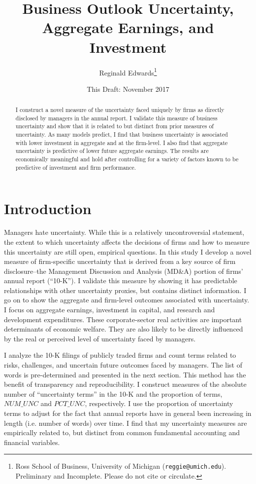 \documentclass[12pt, letterpaper]{article}
\begin{document}
 

\title{Business Outlook Uncertainty, Aggregate Earnings, and Investment}
\author{Reginald Edwards\footnote{Ross School of Business, University of Michigan
(\texttt{reggie@umich.edu}). Preliminary and Incomplete. Please do not cite or circulate.}} 
\date{This Draft: November 2017}

\maketitle 
\begin{abstract} 
I construct a novel measure of the uncertainty faced uniquely by firms as directly disclosed by managers in the annual report. I validate this measure of business uncertainty and show that it is related to but distinct from prior measures of uncertainty. As many models predict, I find that business uncertainty is associated with lower investment in aggregate and at the firm-level. I also find that aggregate uncertainty is predictive of lower future aggregate earnings. The results are economically meaningful and hold after controlling for a variety of factors known to be predictive of investment and firm performance.
\end{abstract}

\newpage 

\section{Introduction}\label{introduction} 
Managers hate uncertainty. While this is a relatively uncontroversial statement, the extent to which uncertainty affects the decisions of firms and how to measure this uncertainty are still open, empirical questions. In this study I develop a novel measure of firm-specific uncertainty that is derived from a key source of firm disclosure--the Management Discussion and Analysis (MD\&A) portion of firms' annual report (``10-K''). I validate this measure by showing it has predictable relationships with other uncertainty proxies, but contains distinct information. I go on to show the aggregate and firm-level outcomes associated with uncertainty. I focus on aggregate earnings, investment in capital, and research and development expenditures. These corporate-sector real activities are important determinants of economic welfare. They are also likely to be directly influenced by the real or perceived level of uncertainty faced by managers.

I analyze the 10-K filings of publicly traded firms and count terms related to risks, challenges, and uncertain future outcomes faced by managers. The list of words is pre-determined and presented in the next section. This method has the benefit of transparency and reproducibility. I construct measures of the absolute number of ``uncertainty terms'' in the 10-K and the proportion of terms, $NUM\_UNC$ and $PCT\_UNC$, respectively. I use the proportion of uncertainty terms to adjust for the fact that annual reports have in general been increasing in length (i.e. number of words) over time. I find that my uncertainty measures are empirically related to, but distinct from common fundamental accounting and financial variables. 
\end{document}
